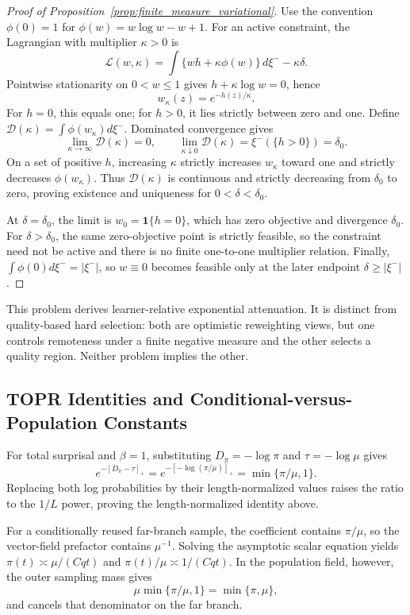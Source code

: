 \documentclass[sigconf,anonymous,review]{acmart}
\theoremstyle{acmdefinition}
\begin{document}
\begin{proof}[Proof of Proposition~\ref{prop:finite_measure_variational}]
Use the convention
\(\phi(0)=1\) for
\(\phi(w)=w\log w-w+1\). For an active constraint, the Lagrangian with
multiplier \(\kappa>0\) is
\[
\mathcal L(w,\kappa)
=\int\{wh+\kappa\phi(w)\}\,d\xi^- -\kappa\delta.
\]
Pointwise stationarity on \(0<w\le1\) gives
\(h+\kappa\log w=0\), hence
\[
w_\kappa(z)=e^{-h(z)/\kappa}.
\]
For \(h=0\), this equals one; for \(h>0\), it lies strictly between
zero and one. Define
\(\mathcal D(\kappa)=\int\phi(w_\kappa)d\xi^-\). Dominated convergence gives
\[
\lim_{\kappa\to\infty}\mathcal D(\kappa)=0,
\qquad
\lim_{\kappa\downarrow0}\mathcal D(\kappa)
=\xi^-(\{h>0\})=\delta_0.
\]
On a set of positive \(h\), increasing \(\kappa\) strictly increases
\(w_\kappa\) toward one and strictly decreases \(\phi(w_\kappa)\).
Thus \(\mathcal D(\kappa)\) is continuous and strictly decreasing from
\(\delta_0\) to zero, proving existence and uniqueness for
\(0<\delta<\delta_0\).

At \(\delta=\delta_0\), the limit is
\(w_0=\mathbf1\{h=0\}\), which has zero objective and divergence
\(\delta_0\). For \(\delta>\delta_0\), the same zero-objective point is
strictly feasible, so the constraint need not be active and there is no
finite one-to-one multiplier relation. Finally,
\(\int\phi(0)d\xi^-=|\xi^-|\), so \(w\equiv0\) becomes feasible only at the later
endpoint \(\delta\ge|\xi^-|\).
\end{proof}

This problem derives learner-relative exponential attenuation. It is
distinct from quality-based hard selection: both are optimistic
reweighting views, but one controls remoteness under a finite negative
measure and the other selects a quality region. Neither problem implies
the other.

\subsection{TOPR Identities and Conditional-versus-Population Constants}
\label{app:topr_relation}

For total surprisal and \(\beta=1\), substituting
\(D_\pi=-\log\pi\) and \(\tau=-\log\mu\) gives
\[
e^{-[D_\pi-\tau]_+}
=e^{-[-\log(\pi/\mu)]_+}
=\min\{\pi/\mu,1\}.
\]
Replacing both log probabilities by their length-normalized values
raises the ratio to the \(1/L\) power, proving the
length-normalized identity above.

For a conditionally reused far-branch sample, the coefficient contains
\(\pi/\mu\), so the vector-field prefactor contains \(\mu^{-1}\).
Solving the asymptotic scalar equation yields
\(\pi(t)\asymp\mu/(Cqt)\) and
\(\pi(t)/\mu\asymp1/(Cqt)\). In the population field, however, the
outer sampling mass gives
\[
\mu\min\{\pi/\mu,1\}=\min\{\pi,\mu\},
\]
and cancels that denominator on the far branch.
\end{document}
